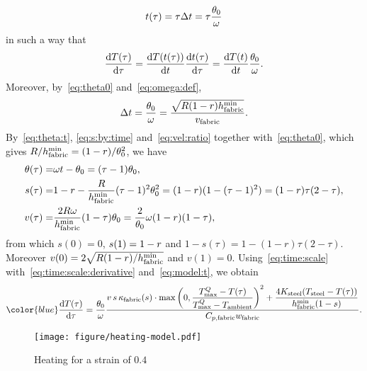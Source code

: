 \[
    t(\tau) = \tau \Delta t = \tau\dfrac{\theta_0}{\omega}
\]
in such a way that
\begin{equation}\label{eq:time:scale:derivative}
   \dfrac{\mathrm{d} T(\tau)}{\mathrm{d}\tau}=
   \dfrac{\mathrm{d} T(t(\tau))}{\mathrm{d}t}\dfrac{\mathrm{d} t(\tau)}{\mathrm{d}\tau}=
   \dfrac{\mathrm{d} T(t)}{\mathrm{d}t}\dfrac{\theta_0}{\omega}.
\end{equation}
Moreover, by~\eqref{eq:theta0} and~\eqref{eq:omega:def},
\begin{equation}\label{eq:time:scale}
  \Delta t = 
  \dfrac{\theta_0}{\VRot} %
  =\dfrac{\sqrt{\Roller(1-r)\htissuemin}}{\VT}.
\end{equation}
By~\eqref{eq:theta:t}, \eqref{eq:s:by:time} and~\eqref{eq:vel:ratio} together with~\eqref{eq:theta0}, which gives $R/h_{\mathrm{fabric}}^{\min}=(1-r)/\theta_0^2$, we have
\begin{equation}\label{eq:st:tau}
  \begin{split}
   \theta(\tau) = & \omega t - \theta_0 = (\tau-1)\theta_0,
   \\
   s(\tau)
   = &
   1-r - \dfrac{R}{h_{\mathrm{fabric}}^{\min}}(\tau-1)^2\theta_0^2
   = 
   (1-r)(1 - (\tau-1)^2)
   = 
   (1-r)\tau(2-\tau),
   \\
   v(\tau) = &
   \dfrac{2R\omega}{h_{\mathrm{fabric}}^{\min}}(1-\tau)\theta_0=
   \dfrac{2}{\theta_0}\omega(1-r)(1-\tau),
   \end{split}
\end{equation}
from which $s(0)=0$, $s(1)=1-r$ and $1-s(\tau) = 1-(1-r)\tau(2-\tau)$.
Moreover $v(0)=2\sqrt{R(1-r)/h_{\mathrm{fabric}}^{\min}}$ and $v(1)=0$.
Using~\eqref{eq:time:scale} with~\eqref{eq:time:scale:derivative} and~\eqref{eq:model:t}, we obtain
\begin{equation}\label{eq:model:tau}
   \color{blue}
   \dfrac{\mathrm{d} T(\tau)}{\mathrm{d}\tau}=
   \dfrac{\theta_0}{\VRot}
   \dfrac{
    v\,s\,\Ytissue(s)\cdot 
   \max\left(0,\dfrac{\TmaxQ-T(\tau)}{\TmaxQ-\Tamb}\right)^2
   +
   \dfrac{4\Ksteel(\Tsteel-\Tmodel(\tau))}{\htissuemin(1-s)}
   }{\Cptissue\wtissue}.
\end{equation}


\begin{figure}[H]
  \begin{center}
    \texttt{[image: figure/heating-model.pdf]}
  \end{center}
  \caption{
  Heating for a strain of $0.4$}
  \label{fig:heating2}
\end{figure}

